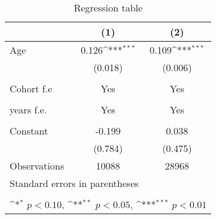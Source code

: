 \begin{table}[htbp]\centering
\def\sym#1{\ifmmode^{#1}\else\(^{#1}\)\fi}
\caption{Regression table \label{reg1}}
\begin{tabular}{l*{2}{c}}
\toprule
                    &\multicolumn{1}{c}{(1)}         &\multicolumn{1}{c}{(2)}         \\
\midrule
Age                 &       0.126\sym{***}&       0.109\sym{***}\\
                    &     (0.018)         &     (0.006)         \\
                    \\
                    Cohort f.e           &       Yes        &      Yes \\
                                                \\
                    \addlinespace
                    years f.e.            &       Yes         &       Yes         \\
                                               \\
                    \addlinespace
Constant            &      -0.199         &       0.038         \\
                    &     (0.784)         &     (0.475)         \\
\midrule
Observations        &       10088         &       28968         \\
\bottomrule
\multicolumn{3}{l}{\footnotesize Standard errors in parentheses}\\
\multicolumn{3}{l}{\footnotesize }\\
\multicolumn{3}{l}{\footnotesize \sym{*} \(p<0.10\), \sym{**} \(p<0.05\), \sym{***} \(p<0.01\)}\\
\end{tabular}
\end{table}

